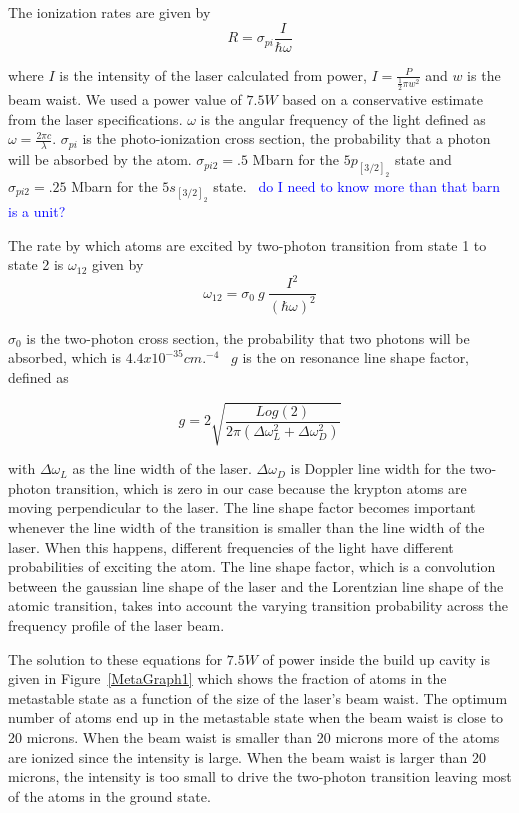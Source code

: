 \documentclass[prb,preprint]{revtex4-1}
\begin{document}
The ionization rates are given by 
\begin{equation}
\label{IonizationRates}
R = \sigma_{pi} \frac{I}{\hbar\omega}
\end{equation}

where $I$ is the intensity of the laser calculated from power, $I = \frac{P}{\frac{1}{2}\pi w^2}$ and $w$ is the beam waist. We used a power value of $7.5 W$ based on a conservative estimate from the laser specifications. $\omega$ is the angular frequency of the light defined as $\omega = \frac{2\pi c}{\lambda}$. $\sigma_{pi}$ is the photo-ionization cross section, the probability that a photon will be absorbed by the atom. $\sigma_{pi2} = .5$ Mbarn for the $5p_{[3/2]_2}$ state and $\sigma_{pi2} = .25$ Mbarn for the $5s_{[3/2]_2}$ state.~\cite{Cannon} \textcolor{blue}{do I need to know more than that barn is a unit?}

The rate by which atoms are excited by two-photon transition from state 1 to state 2 is $\omega_{12}$ given by
\begin{equation}
\label{ExcitationRate}
\omega_{12} = \sigma_0\ g\ \frac{I^2}{(\hbar \omega)^2}
\end{equation}

$\sigma_0$ is the two-photon cross section, the probability that two photons will be absorbed, which is $4.4x10^{-35} cm.^{-4}$~\cite{NIST} $g$ is the on resonance line shape factor, defined as 

\begin{equation}
\label{LineShapeFactor}
g = 2 \sqrt{\frac{Log(2)}{2 \pi (\Delta \omega_L^2 + \Delta \omega_D^2)}}
\end{equation}

with $\Delta\omega_L$ as the line width of the laser. $\Delta \omega_D$ is Doppler line width for the two-photon transition, which is zero in our case because the krypton atoms are moving perpendicular to the laser.  The line shape factor becomes important whenever the line width of the transition is smaller than the line width of the laser.  When this happens, different frequencies of the light have different probabilities of exciting the atom.  The line shape factor, which is a convolution between the gaussian line shape of the laser and the Lorentzian line shape of the atomic transition, takes into account the varying transition probability across the frequency profile of the laser beam. 

The solution to these equations for $7.5 W$ of power inside the build up cavity is given in Figure~\ref{MetaGraph1} which shows the fraction of atoms in the metastable state as a function of the size of the laser's beam waist. The optimum number of atoms end up in the metastable state when the beam waist is close to 20 microns. When the beam waist is smaller than 20 microns more of the atoms are ionized since the intensity is large. When the beam waist is larger than 20 microns, the intensity is too small to drive the two-photon transition leaving most of the atoms in the ground state.
\end{document}
